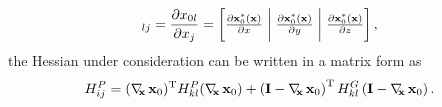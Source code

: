 \begin{equation}
[\Dx \vxo]_{lj} =  \frac{\partial x_{0 l}	}{\partial x_j} =  
\begin{bmatrix} \frac{\partial \vxo^*(\vx)}{\partial x} \hspace{1mm} \bigg| & \hspace{-2.5mm}  \frac{\partial \vxo^*(\vx)}{ \partial y} \hspace{1mm} \bigg| & \hspace{-2.5mm} \frac{\partial \vxo^*(\vx)}{ \partial z} 
 \\[.3em] \end{bmatrix},
\end{equation}
the Hessian under consideration can be written in a matrix form as
\begin{equation}
\label{eq:app:Hpij}
H_{ij}^P = (\Dx \vxo)^{\mathrm{T}}  H_{kl}^P (\Dx \vxo) + \left( \mathbf{I} - \Dx \vxo \right)^{\mathrm{T}} H^G_{kl} \left( \mathbf{I} - \Dx \vxo \right).
\end{equation}

